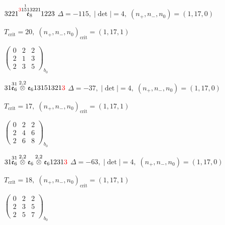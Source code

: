 \documentclass[10pt]{article}
\begin{document}
\smallskip

$3221\overset{\textcolor{red}{3}1\overset{1}{5}13221}{\mathfrak{e}_8}1223$ \quad $\Delta=-115,\; |\det|=4,\; (n_+,n_-,n_0)=(1,17,0)$

\hspace{1em}$T_{\text{crit}}=20,\; (n_+,n_-,n_0)_{\text{crit}}=(1,17,1)$

\hspace{2em}$\left(\begin{smallmatrix}0 & 2 & 2 \\ 2 & 1 & 3 \\ 2 & 3 & 5\end{smallmatrix}\right)_{\!b_0}$

\smallskip

$31\overset{31}{\mathfrak{e}_6}\overset{2,2}{\otimes}\mathfrak{e}_613151321\textcolor{red}{3}$ \quad $\Delta=-37,\; |\det|=4,\; (n_+,n_-,n_0)=(1,17,0)$

\hspace{1em}$T_{\text{crit}}=17,\; (n_+,n_-,n_0)_{\text{crit}}=(1,17,1)$

\hspace{2em}$\left(\begin{smallmatrix}0 & 2 & 2 \\ 2 & 4 & 6 \\ 2 & 6 & 8\end{smallmatrix}\right)_{\!b_0}$

\smallskip

$31\overset{31}{\mathfrak{e}_6}\overset{2,2}{\otimes}\mathfrak{e}_6\overset{2,2}{\otimes}\mathfrak{e}_61231\textcolor{red}{3}$ \quad $\Delta=-63,\; |\det|=4,\; (n_+,n_-,n_0)=(1,17,0)$

\hspace{1em}$T_{\text{crit}}=18,\; (n_+,n_-,n_0)_{\text{crit}}=(1,17,1)$

\hspace{2em}$\left(\begin{smallmatrix}0 & 2 & 2 \\ 2 & 3 & 5 \\ 2 & 5 & 7\end{smallmatrix}\right)_{\!b_0}$

\smallskip
\end{document}
